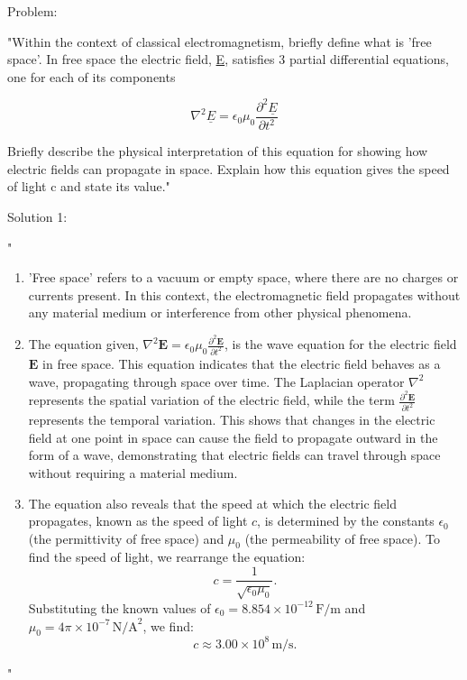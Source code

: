 Problem: 

"Within the context of classical electromagnetism, briefly define what is 'free space'. In free space the electric field, \underline{E}, satisfies 3 partial differential equations, one for each of its components

\[
\nabla^{2}\underline{E} =  \epsilon_{0}\mu_{0}\frac{\partial^2 \underline{E}}{\partial t^{2}}
\]

Briefly describe the physical interpretation of this equation for showing how electric fields can propagate in space. Explain how this equation gives the speed of light c and state its value." 

Solution 1: 

"\begin{enumerate}
    \item 'Free space' refers to a vacuum or empty space, where there are no charges or currents present. In this context, the electromagnetic field propagates without any material medium or interference from other physical phenomena.
    
    \item The equation given, $\nabla^2 \mathbf{E} = \epsilon_0 \mu_0 \frac{\partial^2 \mathbf{E}}{\partial t^2}$, is the wave equation for the electric field $\mathbf{E}$ in free space. This equation indicates that the electric field behaves as a wave, propagating through space over time. The Laplacian operator $\nabla^2$ represents the spatial variation of the electric field, while the term $\frac{\partial^2 \mathbf{E}}{\partial t^2}$ represents the temporal variation. This shows that changes in the electric field at one point in space can cause the field to propagate outward in the form of a wave, demonstrating that electric fields can travel through space without requiring a material medium.

    \item The equation also reveals that the speed at which the electric field propagates, known as the speed of light $c$, is determined by the constants $\epsilon_0$ (the permittivity of free space) and $\mu_0$ (the permeability of free space). To find the speed of light, we rearrange the equation:
    \[
    c = \frac{1}{\sqrt{\epsilon_0 \mu_0}}.
    \]
    Substituting the known values of $\epsilon_0 = 8.854 \times 10^{-12} \, \text{F/m}$ and $\mu_0 = 4\pi \times 10^{-7} \, \text{N/A}^2$, we find:
    \[
    c \approx 3.00 \times 10^8 \, \text{m/s}.
    \]
\end{enumerate}"

